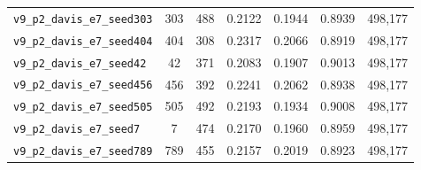 \begin{table}[!h]
\begin{tabular}{p{4.8cm}cccccc}
\texttt{v9\_\allowbreak{}p2\_\allowbreak{}davis\_\allowbreak{}e7\_\allowbreak{}seed303} & 303 & 488 & 0.2122 & 0.1944 & 0.8939 & 498,177 \\
\texttt{v9\_\allowbreak{}p2\_\allowbreak{}davis\_\allowbreak{}e7\_\allowbreak{}seed404} & 404 & 308 & 0.2317 & 0.2066 & 0.8919 & 498,177 \\
\texttt{v9\_\allowbreak{}p2\_\allowbreak{}davis\_\allowbreak{}e7\_\allowbreak{}seed42} & 42 & 371 & 0.2083 & 0.1907 & 0.9013 & 498,177 \\
\texttt{v9\_\allowbreak{}p2\_\allowbreak{}davis\_\allowbreak{}e7\_\allowbreak{}seed456} & 456 & 392 & 0.2241 & 0.2062 & 0.8938 & 498,177 \\
\texttt{v9\_\allowbreak{}p2\_\allowbreak{}davis\_\allowbreak{}e7\_\allowbreak{}seed505} & 505 & 492 & 0.2193 & 0.1934 & 0.9008 & 498,177 \\
\texttt{v9\_\allowbreak{}p2\_\allowbreak{}davis\_\allowbreak{}e7\_\allowbreak{}seed7} & 7 & 474 & 0.2170 & 0.1960 & 0.8959 & 498,177 \\
\texttt{v9\_\allowbreak{}p2\_\allowbreak{}davis\_\allowbreak{}e7\_\allowbreak{}seed789} & 789 & 455 & 0.2157 & 0.2019 & 0.8923 & 498,177 \\
\bottomrule
\end{tabular}
\end{table}

